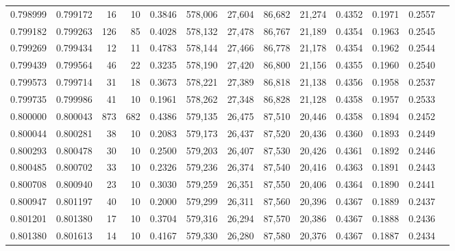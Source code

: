 \begin{tabular}{rrrrrrrrrrrrr}
0.798999 & 0.799172 &    16 &  10 &                                     0.3846 & 578,006 &  27,604 &  86,682 &  21,274 & 0.4352 & 0.1971 & 0.2557 \\
0.799182 & 0.799263 &   126 &  85 &                                     0.4028 & 578,132 &  27,478 &  86,767 &  21,189 & 0.4354 & 0.1963 & 0.2545 \\
0.799269 & 0.799434 &    12 &  11 &                                     0.4783 & 578,144 &  27,466 &  86,778 &  21,178 & 0.4354 & 0.1962 & 0.2544 \\
0.799439 & 0.799564 &    46 &  22 &                                     0.3235 & 578,190 &  27,420 &  86,800 &  21,156 & 0.4355 & 0.1960 & 0.2540 \\
0.799573 & 0.799714 &    31 &  18 &                                     0.3673 & 578,221 &  27,389 &  86,818 &  21,138 & 0.4356 & 0.1958 & 0.2537 \\
0.799735 & 0.799986 &    41 &  10 &                                     0.1961 & 578,262 &  27,348 &  86,828 &  21,128 & 0.4358 & 0.1957 & 0.2533 \\
0.800000 & 0.800043 &   873 & 682 &                                     0.4386 & 579,135 &  26,475 &  87,510 &  20,446 & 0.4358 & 0.1894 & 0.2452 \\
0.800044 & 0.800281 &    38 &  10 &                                     0.2083 & 579,173 &  26,437 &  87,520 &  20,436 & 0.4360 & 0.1893 & 0.2449 \\
0.800293 & 0.800478 &    30 &  10 &                                     0.2500 & 579,203 &  26,407 &  87,530 &  20,426 & 0.4361 & 0.1892 & 0.2446 \\
0.800485 & 0.800702 &    33 &  10 &                                     0.2326 & 579,236 &  26,374 &  87,540 &  20,416 & 0.4363 & 0.1891 & 0.2443 \\
0.800708 & 0.800940 &    23 &  10 &                                     0.3030 & 579,259 &  26,351 &  87,550 &  20,406 & 0.4364 & 0.1890 & 0.2441 \\
0.800947 & 0.801197 &    40 &  10 &                                     0.2000 & 579,299 &  26,311 &  87,560 &  20,396 & 0.4367 & 0.1889 & 0.2437 \\
0.801201 & 0.801380 &    17 &  10 &                                     0.3704 & 579,316 &  26,294 &  87,570 &  20,386 & 0.4367 & 0.1888 & 0.2436 \\
0.801380 & 0.801613 &    14 &  10 &                                     0.4167 & 579,330 &  26,280 &  87,580 &  20,376 & 0.4367 & 0.1887 & 0.2434 \\

\end{tabular}
